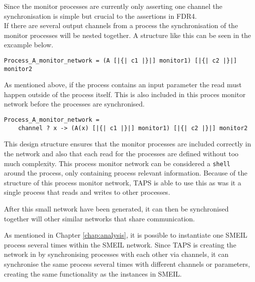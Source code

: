 Since the monitor processes are currently only asserting one channel the synchronisation is simple but crucial to the assertions in FDR4.\\

If there are several output channels from a process the synchronisation of the monitor processes will be nested together. A structure like this can be seen in the excample below.
\begin{verbatim}
Process_A_monitor_network = (A [|{| c1 |}|] monitor1) [|{| c2 |}|] monitor2
\end{verbatim}
As mentioned above, if the process contains an input parameter the read must happen outside of the process itself. This is also included in this proces monitor network before the processes are synchronised.
\begin{verbatim}
Process_A_monitor_network =
    channel ? x -> (A(x) [|{| c1 |}|] monitor1) [|{| c2 |}|] monitor2
\end{verbatim}
This design structure ensures that the monitor processes are included correctly in the network and also that each read for the processes are defined without too much complexity. This process monitor network can be considered a \texttt{shell} around the process, only containing process relevant information. Because of the structure of this process monitor network, TAPS is able to use this as was it a single process that reads and writes to other processes.

After this small network have been generated, it can then be synchronised together will other similar networks that share communication.

As mentioned in Chapter \ref{chap:analysis}, it is possible to instantiate one SMEIL process several times within the SMEIL network. Since TAPS is creating the network in \cspm{} by synchronising processes with each other via channels, it can synchronise the same process several times with different channels or parameters, creating the same functionality as the instances in SMEIL.\\


